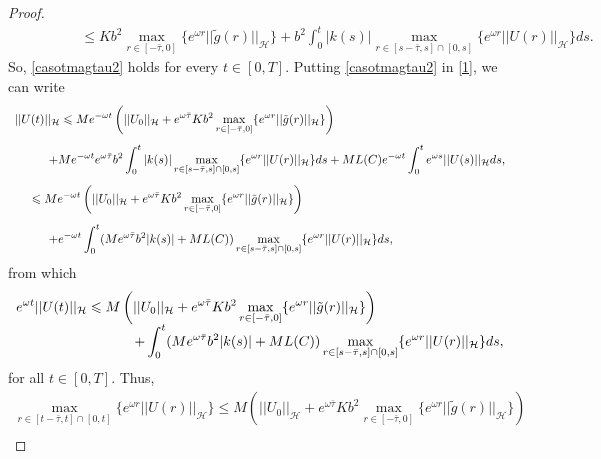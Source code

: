 \documentclass[11pt]{article}
\renewcommand{\leq}{\leqslant}
\begin{document}
\begin{proof}
$$\begin{array}{l}
	\displaystyle{\hspace{2cm}\leq Kb^2\max_{r\in[-\bar{\tau},0]}\{e^{\omega r}||\tilde{g}(r)||_{\mathcal H}\}+b^2\int_{0}^{t}|k(s)|\max_{r\in[s-\bar{\tau},s]\cap[0,s]}\{e^{\omega r}||U(r)||_{\mathcal H}\} ds.}
\end{array}$$
So, \eqref{casotmagtau2} holds for every $t\in [0,T]$. Putting \eqref{casotmagtau2} in \eqref{1}, we can write
$$\begin{array}{l}
	\vspace{0.3cm}\displaystyle{ ||U(t)||_{\mathcal H}\leq Me^{-\omega t}\left(||U_0||_{\mathcal H}+e^{\omega\bar{\tau}}Kb^2\max_{r\in[-\bar{\tau},0]}\{e^{\omega r}||\tilde{g}(r)||_{\mathcal H}\}\right)}\\
	\vspace{0.3cm}\displaystyle{\hspace{1cm}+Me^{-\omega t}e^{\omega\bar{\tau}}b^2\int_{0}^{t}|k(s)|\max_{r\in[s-\bar{\tau},s]\cap[0,s]}\{e^{\omega r}||U(r)||_{\mathcal H}\} ds+ML(C)e^{-\omega t} \int_0^t e^{\omega s} ||U(s)||_{\mathcal H} ds,}\\	
	\vspace{0.3cm}\displaystyle{ \hspace{0.5cm}\leq Me^{-\omega t}\left(||U_0||_{\mathcal H}+e^{\omega\bar{\tau}}Kb^2\max_{r\in[-\bar{\tau},0]}\{e^{\omega r}||\tilde{g}(r)||_{\mathcal H}\}\right)}\\
	\displaystyle{\hspace{1cm}+e^{-\omega t}\int_{0}^{t}(Me^{\omega\bar{\tau}}b^2|k(s)|+ML(C))\max_{r\in[s-\bar{\tau},s]\cap[0,s]}\{e^{\omega r}||U(r)||_{\mathcal H}\} ds,}
\end{array}$$
from which
$$
\begin{array}{l}
\displaystyle{ e^{\omega t} ||U(t)||_{\mathcal H} \leq  M\left(||U_0||_{\mathcal H}+e^{\omega\bar{\tau}}Kb^2\max_{r\in[-\bar{\tau},0]}\{e^{\omega r}||\tilde{g}(r)||_{\mathcal H}\}\right)}\\
\hspace{2 cm}
\displaystyle{\hspace{1cm} +\int_{0}^{t}(Me^{\omega\bar{\tau}}b^2|k(s)|+ML(C))\max_{r\in[s-\bar{\tau},s]\cap[0,s]}\{e^{\omega r}||U(r)||_{\mathcal H}\} ds,}
\end{array}
$$
for all $t\in [0,T]$. Thus,
$$
\begin{array}{l}
	\displaystyle{ \max_{r\in[t-\bar{\tau},t]\cap[0,t]}\{e^{\omega r} ||U(r)||_{\mathcal H} \}\leq  M\left(||U_0||_{\mathcal H}+e^{\omega\bar{\tau}}Kb^2\max_{r\in[-\bar{\tau},0]}\{e^{\omega r}||\tilde{g}(r)||_{\mathcal H}\}\right)}\\

\end{array}$$
\end{proof}
\end{document}
